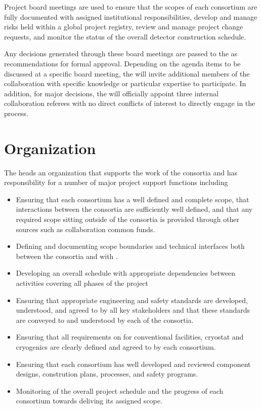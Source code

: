 Project board meetings are used to ensure that the scopes of each
consortium are fully documented with assigned institutional
responsibilities, develop and manage risks held within a global
project registry, review and manage project change requests, and
monitor the status of the overall detector construction schedule.

Any decisions generated through these board meetings are passed to 
the   as recommendations for formal approval.
Depending on the agenda items to be discussed at a specific board 
meeting, the  will invite additional members of the 
collaboration with specific knowledge or particular expertise to 
participate.  In addition, for major decisions, the  
will officially appoint three internal collaboration referees with 
no direct conflicts of interest to directly engage in the process.

\section{ Organization}
\label{sec:tco}

The  heads an organization that supports the work of 
the consortia and has responsibility for a number of major project 
support functions including

\begin{itemize}
\item Ensuring that each consortium has a well defined and complete
  scope, that interactions between the consortia are sufficiently 
  well defined, and that any required scope sitting outside of the 
  consortia is provided through other sources such as collaboration
  common funds.
\item Defining and documenting scope boundaries and technical 
  interfaces both between the consortia and with .  
\item Developing an overall schedule with appropriate dependencies
  between activities covering all phases of the project 
\item Ensuring that appropriate engineering and safety standards 
  are developed, understood, and agreed to by all key stakeholders 
  and that these standards are conveyed to and understood by each
   of the consortia.
\item Ensuring that all  requirements on  
  for conventional facilities, cryostat and cryogenics are clearly
  defined and agreed to by each consortium.
\item Ensuring that each consortium has well developed and reviewed
  component designs, constrution plans,  processes, and 
  safety programs.
\item Monitoring of the overall project schedule and the progress 
  of each consortium towards deliving its assigned scope. 
\end{itemize}
 
